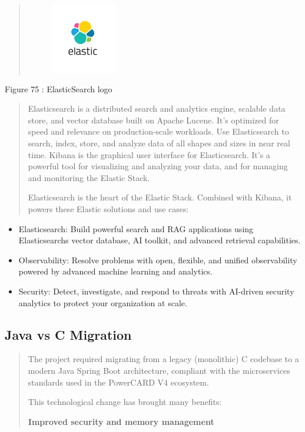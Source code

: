 \documentclass[12pt,a4paper]{report}
\begin{document}
\begin{quote}
\includegraphics[width=1.97151in,height=1.1981in]{vertopal_d1b0b2209edd4c6aa8254f57daa0953b/media/image96.png}
\end{quote}

\protect\hypertarget{_Toc201954551}{}{}Figure 75 : ElasticSearch logo

\begin{quote}
Elasticsearch is a distributed search and analytics engine, scalable
data store, and vector database built on Apache Lucene. It's optimized
for speed and relevance on production-scale workloads. Use Elasticsearch
to search, index, store, and analyze data of all shapes and sizes in
near real time. Kibana is the graphical user interface for
Elasticsearch. It's a powerful tool for visualizing and analyzing your
data, and for managing and monitoring the Elastic Stack.

Elasticsearch is the heart of the Elastic Stack. Combined with Kibana,
it powers these Elastic solutions and use cases:
\end{quote}

\begin{itemize}
\item
  Elasticsearch: Build powerful search and RAG applications using
  Elasticsearch\textquotesingle s vector database, AI toolkit, and
  advanced retrieval capabilities.
\item
  Observability: Resolve problems with open, flexible, and unified
  observability powered by advanced machine learning and analytics.
\item
  Security: Detect, investigate, and respond to threats with AI-driven
  security analytics to protect your organization at scale.
\end{itemize}

\hypertarget{java-vs-c-migration}{%
\subsection{\texorpdfstring{\textbf{Java vs C
Migration}}{Java vs C Migration}}\label{java-vs-c-migration}}

\begin{quote}
The project required migrating from a legacy (monolithic) C codebase to
a modern Java Spring Boot architecture, compliant with the microservices
standards used in the PowerCARD V4 ecosystem.

This technological change has brought many benefits:

\textbf{Improved security and memory management}
\end{quote}
\end{document}
